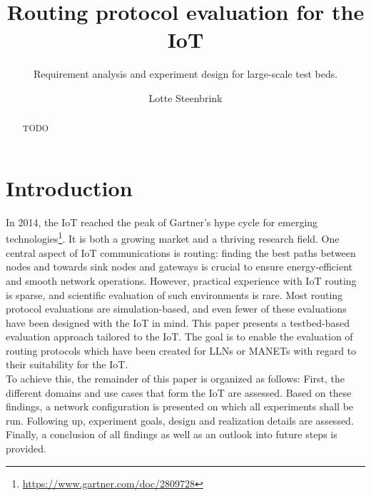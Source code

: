 \documentclass{acm_proc_article-sp}
\begin{document}
\title{Routing protocol evaluation for the IoT}
\subtitle{Requirement analysis and experiment design for large-scale test beds.}

\author{
\alignauthor
Lotte Steenbrink
}

\maketitle
\begin{abstract}
TODO
\end{abstract}


\section{Introduction}
\label{sec:Intro}
In 2014, the \gls{IoT} reached the peak of Gartner's hype cycle for emerging technologies\footnote{\url{https://www.gartner.com/doc/2809728}}. It is both a growing market and a thriving research field. One central aspect of IoT communications is routing: finding the best paths between nodes and towards sink nodes and gateways is crucial to ensure energy-efficient and smooth network operations. However, practical experience with IoT routing is sparse, and scientific evaluation of such environments is rare. Most routing protocol evaluations are simulation-based, and even fewer of these evaluations have been designed with the IoT in mind.
This paper presents a testbed-based evaluation approach tailored to the IoT. The goal is to enable the evaluation of routing protocols which have been created for \glspl{LLN} or \glspl{MANET} with regard to their suitability for the IoT.\\
To achieve this, the remainder of this paper is organized as follows:
First, the different domains and use cases that form the IoT are assessed. Based on these findings, a network configuration is presented on which all experiments shall be run. Following up, experiment goals, design and realization details are assessed. Finally, a conclusion of all findings as well as an outlook into future steps is provided.
\end{document}
